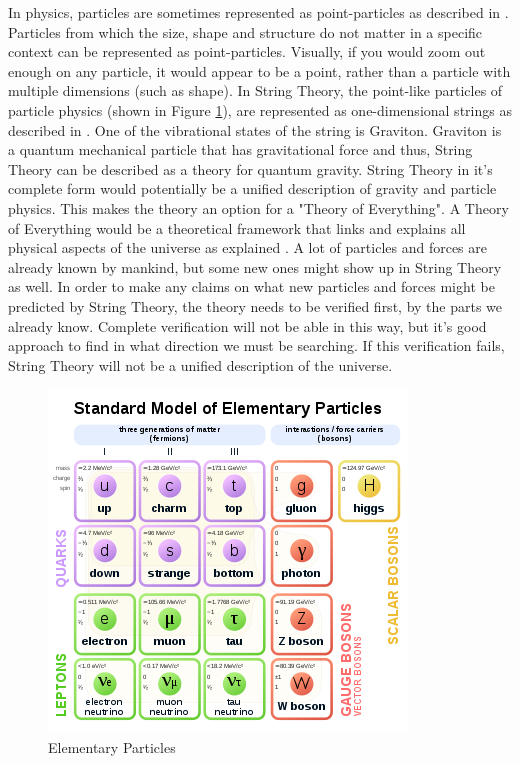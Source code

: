 \documentclass[../paper.tex]{subfiles}
\begin{document}
In physics, particles are sometimes represented as point-particles as described in \citep{PointParticle}. Particles from which the size, shape and structure do not matter in a specific context can be represented as point-particles. Visually, if you would zoom out enough on any particle, it would appear to be a point, rather than a particle with multiple dimensions (such as shape). In String Theory, the point-like particles of particle physics (shown in Figure \ref{Elementary Particles}), are represented as one-dimensional strings as described in \citep{StringTheory}. One of the vibrational states of the string is Graviton. Graviton is a quantum mechanical particle that has gravitational force and thus, String Theory can be described as a theory for quantum gravity. String Theory in it's complete form would potentially be a unified description of gravity and particle physics. This makes the theory an option for a "Theory of Everything". A Theory of Everything would be a theoretical framework that links and explains all physical aspects of the universe as explained \citep{TheoryOfEverything}. A lot of particles and forces are already known by mankind, but some new ones might show up in String Theory as well. In order to make any claims on what new particles and forces might be predicted by String Theory, the theory needs to be verified first, by the parts we already know. Complete verification will not be able in this way, but it's good approach to find in what direction we must be searching. If this verification fails, String Theory will not be a unified description of the universe. 

\begin{figure}[!htb]
\centering
\includegraphics[scale = 0.5]{String Theory/ElementaryParticles.png}
\caption{Elementary Particles}
\label{Elementary Particles}
\end{figure}
\end{document}
